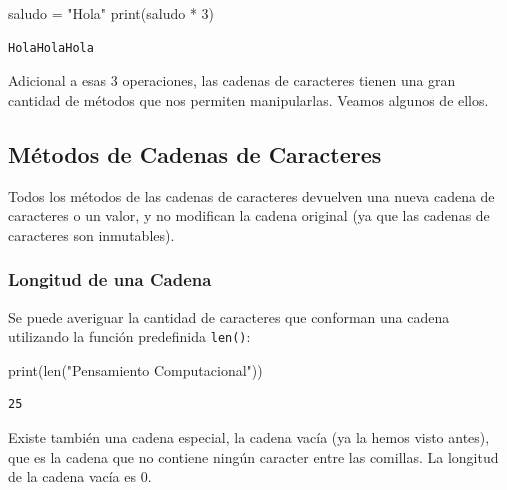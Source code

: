 \documentclass[
  letterpaper,
  DIV=11,
  numbers=noendperiod]{scrreprt}
\newenvironment{Shaded}{\begin{snugshade}}{\end{snugshade}}
\newcommand{\BuiltInTok}[1]{\textcolor[rgb]{0.00,0.23,0.31}{#1}}
\newcommand{\DecValTok}[1]{\textcolor[rgb]{0.68,0.00,0.00}{#1}}
\newcommand{\NormalTok}[1]{\textcolor[rgb]{0.00,0.23,0.31}{#1}}
\newcommand{\OperatorTok}[1]{\textcolor[rgb]{0.37,0.37,0.37}{#1}}
\newcommand{\StringTok}[1]{\textcolor[rgb]{0.13,0.47,0.30}{#1}}
\begin{document}
\begin{Shaded}
\begin{Highlighting}[]
\NormalTok{saludo }\OperatorTok{=} \StringTok{"Hola"}
\BuiltInTok{print}\NormalTok{(saludo }\OperatorTok{*} \DecValTok{3}\NormalTok{)}
\end{Highlighting}
\end{Shaded}

\begin{verbatim}
HolaHolaHola
\end{verbatim}

Adicional a esas 3 operaciones, las cadenas de caracteres tienen una
gran cantidad de métodos que nos permiten manipularlas. Veamos algunos
de ellos.

\subsection{Métodos de Cadenas de
Caracteres}\label{muxe9todos-de-cadenas-de-caracteres}

Todos los métodos de las cadenas de caracteres devuelven una nueva
cadena de caracteres o un valor, y no modifican la cadena original (ya
que las cadenas de caracteres son inmutables).

\subsubsection{Longitud de una Cadena}\label{longitud-de-una-cadena}

Se puede averiguar la cantidad de caracteres que conforman una cadena
utilizando la función predefinida \texttt{len()}:

\begin{Shaded}
\begin{Highlighting}[]
\BuiltInTok{print}\NormalTok{(}\BuiltInTok{len}\NormalTok{(}\StringTok{"Pensamiento Computacional"}\NormalTok{))}
\end{Highlighting}
\end{Shaded}

\begin{verbatim}
25
\end{verbatim}

Existe también una cadena especial, la cadena vacía (ya la hemos visto
antes), que es la cadena que no contiene ningún caracter entre las
comillas. La longitud de la cadena vacía es 0.
\end{document}
